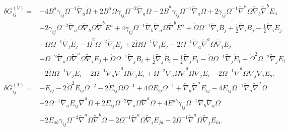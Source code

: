 \documentclass[10pt,letterpaper]{article}
\begin{document}
\begin{align}
\delta G_{ij}^{(V)}={}&-4 B^{a} \gamma_{ij} \Omega^{-1} \tilde{\nabla}_{a}\dot{\Omega}
 + 2 B^{a} \dot{\Omega} \gamma_{ij} \Omega^{-2} \tilde{\nabla}_{a}\Omega
 - 2 \dot{B}^{a} \gamma_{ij} \Omega^{-1} \tilde{\nabla}_{a}\Omega
 + 2 \gamma_{ij} \Omega^{-1} \tilde{\nabla}^{a}\Omega \tilde{\nabla}_{b}\tilde{\nabla}^{b}E_{a}\nonumber\\
& - 2 \gamma_{ij} \Omega^{-2} \tilde{\nabla}_{a}\Omega \tilde{\nabla}_{b}\Omega \tilde{\nabla}^{b}E^{a}
 + 4 \gamma_{ij} \Omega^{-1} \tilde{\nabla}_{b}\tilde{\nabla}_{a}\Omega \tilde{\nabla}^{b}E^{a}
 + \dot{\Omega} \Omega^{-1} \tilde{\nabla}_{i}B_{j}
 + \tfrac{1}{2} \tilde{\nabla}_{i}\dot{B}_{j}
 -  \tfrac{1}{2} \tilde{\nabla}_{i}\ddot{E}_{j}\nonumber\\
& -  \dot{\Omega} \Omega^{-1} \tilde{\nabla}_{i}\dot{E}_{j}
 -  \dot{\Omega}^2 \Omega^{-2} \tilde{\nabla}_{i}E_{j}
 + 2 \ddot{\Omega} \Omega^{-1} \tilde{\nabla}_{i}E_{j}
 - 2 \Omega^{-1} \tilde{\nabla}_{a}\tilde{\nabla}^{a}\Omega \tilde{\nabla}_{i}E_{j}\nonumber\\
& + \Omega^{-2} \tilde{\nabla}_{a}\Omega \tilde{\nabla}^{a}\Omega \tilde{\nabla}_{i}E_{j}
 + \dot{\Omega} \Omega^{-1} \tilde{\nabla}_{j}B_{i}
 + \tfrac{1}{2} \tilde{\nabla}_{j}\dot{B}_{i}
 -  \tfrac{1}{2} \tilde{\nabla}_{j}\ddot{E}_{i}
 -  \dot{\Omega} \Omega^{-1} \tilde{\nabla}_{j}\dot{E}_{i}
 -  \dot{\Omega}^2 \Omega^{-2} \tilde{\nabla}_{j}E_{i}\nonumber\\
& + 2 \ddot{\Omega} \Omega^{-1} \tilde{\nabla}_{j}E_{i}
 - 2 \Omega^{-1} \tilde{\nabla}_{a}\tilde{\nabla}^{a}\Omega \tilde{\nabla}_{j}E_{i}
 + \Omega^{-2} \tilde{\nabla}_{a}\Omega \tilde{\nabla}^{a}\Omega \tilde{\nabla}_{j}E_{i}
 - 2 \Omega^{-1} \tilde{\nabla}^{a}\Omega \tilde{\nabla}_{j}\tilde{\nabla}_{i}E_{a}.
\end{align}
\begin{align}
\delta G_{ij}^{(T)}={}&- \ddot{E}_{ij}
 - 2 \dot{\Omega}^2 E_{ij} \Omega^{-2}
 - 2 \dot{E}_{ij} \dot{\Omega} \Omega^{-1}
 + 4 \ddot{\Omega} E_{ij} \Omega^{-1}
 + \tilde{\nabla}_{a}\tilde{\nabla}^{a}E_{ij}
 - 4 E_{ij} \Omega^{-1} \tilde{\nabla}_{a}\tilde{\nabla}^{a}\Omega\nonumber\\
& + 2 \Omega^{-1} \tilde{\nabla}_{a}E_{ij} \tilde{\nabla}^{a}\Omega
 + 2 E_{ij} \Omega^{-2} \tilde{\nabla}_{a}\Omega \tilde{\nabla}^{a}\Omega
 + 4 E^{ab} \gamma_{ij} \Omega^{-1} \tilde{\nabla}_{b}\tilde{\nabla}_{a}\Omega\nonumber\\
& - 2 E_{ab} \gamma_{ij} \Omega^{-2} \tilde{\nabla}^{a}\Omega \tilde{\nabla}^{b}\Omega
 - 2 \Omega^{-1} \tilde{\nabla}^{a}\Omega \tilde{\nabla}_{i}E_{ja}
 - 2 \Omega^{-1} \tilde{\nabla}^{a}\Omega \tilde{\nabla}_{j}E_{ia}.
\end{align}
\end{document}
